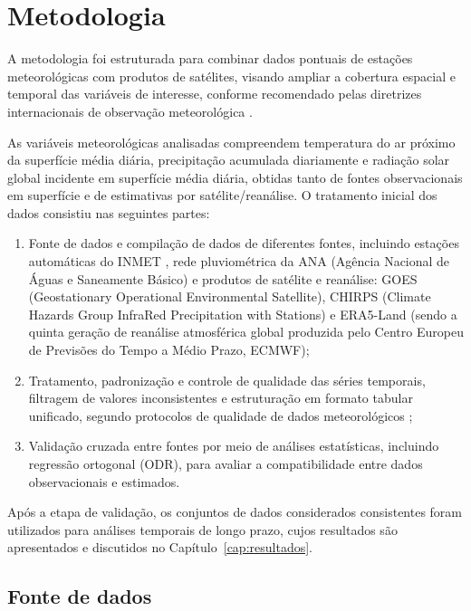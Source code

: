 \chapter{Metodologia}
\label{cap:metodologia}

A metodologia foi estruturada para combinar dados pontuais de estações meteorológicas com produtos de satélites, visando ampliar a cobertura espacial e temporal das variáveis de interesse, conforme recomendado pelas diretrizes internacionais de observação meteorológica \citep{wmo2025}.

As variáveis meteorológicas analisadas compreendem temperatura do ar próximo da superfície média diária, precipitação acumulada diariamente e radiação solar global incidente em superfície média diária, obtidas tanto de fontes observacionais em superfície e de estimativas por satélite/reanálise. O tratamento inicial dos dados consistiu nas seguintes partes:
\begin{enumerate}
    \item Fonte de dados e compilação de dados de diferentes fontes, incluindo estações automáticas do INMET \citep{BDMEP}, rede pluviométrica da ANA (Agência Nacional de Águas e Saneamente Básico) e produtos de satélite e reanálise: GOES (Geostationary Operational Environmental Satellite), CHIRPS (Climate Hazards Group InfraRed Precipitation with Stations) e ERA5-Land (sendo a quinta geração de reanálise atmosférica global produzida pelo Centro Europeu de Previsões do Tempo a Médio Prazo, ECMWF);
    \item Tratamento, padronização e controle de qualidade das séries temporais, filtragem de valores inconsistentes e estruturação em formato tabular unificado, segundo protocolos de qualidade de dados meteorológicos \citep{wmo2025};
    \item Validação cruzada entre fontes por meio de análises estatísticas, incluindo regressão ortogonal (ODR), para avaliar a compatibilidade entre dados observacionais e estimados.
\end{enumerate}

Após a etapa de validação, os conjuntos de dados considerados consistentes foram utilizados para análises temporais de longo prazo, cujos resultados são apresentados e discutidos no Capítulo~\ref{cap:resultados}.

\section{Fonte de dados}

